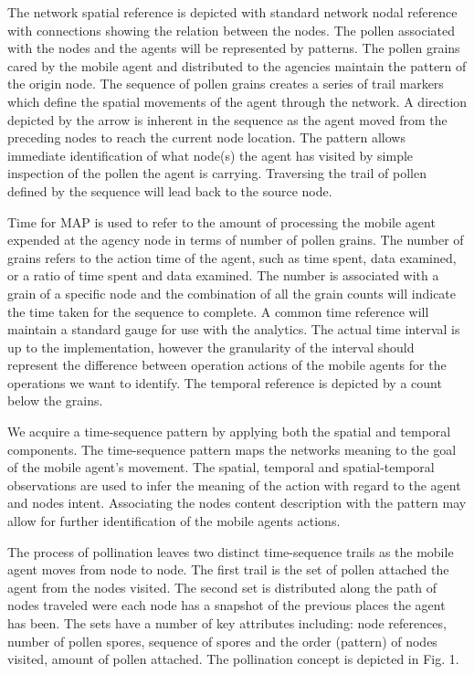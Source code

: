 \documentclass{acm_proc_article-sp}
\begin{document}
The network spatial reference is depicted with standard network nodal reference with connections showing the relation between the nodes.  The pollen associated with the nodes and the agents will be represented by patterns. The pollen grains cared by the mobile agent and distributed to the agencies maintain the pattern of the origin node.  The sequence of pollen grains creates a series of trail markers which define the spatial movements of the agent through the network.  A direction depicted by the arrow is inherent in the sequence as the agent moved from the preceding nodes to reach the current node location. The pattern allows immediate identification of what node(s) the agent has visited by simple inspection of the pollen the agent is carrying. Traversing the trail of pollen defined by the sequence will lead back to the source node.

Time for MAP is used to refer to the amount of processing the mobile agent expended at the agency node in terms of number of pollen grains. The number of grains refers to the action time of the agent, such as time spent, data examined, or a ratio of time spent and data examined.  The number is associated with a grain of a specific node and the combination of all the grain counts will indicate the time taken for the sequence to complete. A common time reference will maintain a standard gauge for use with the analytics. The actual time interval is up to the implementation, however the granularity of the interval should represent the difference between operation actions of the mobile agents for the operations we want to identify.  The temporal reference is depicted by a count below the grains.

We acquire a time-sequence pattern by applying both the spatial and temporal components.  The time-sequence pattern maps the networks meaning to the goal of the mobile agent’s movement.  The spatial, temporal and spatial-temporal observations are used to infer the meaning of the action with regard to the agent and nodes intent. Associating the nodes content description with the pattern may allow for further identification of the mobile agents actions.  

The process of pollination leaves two distinct time-sequence trails as the mobile agent moves from node to node. The first trail is the set of pollen attached the agent from the nodes visited. The second set is distributed along the path of nodes traveled were each node has a snapshot of the previous places the agent has been. The sets have a number of key attributes including: node references, number of pollen spores, sequence of spores and the order (pattern) of nodes visited, amount of pollen attached. The pollination concept is depicted in Fig. 1.
\end{document}
